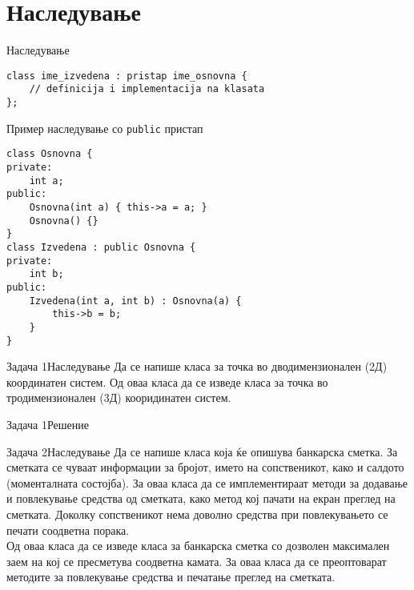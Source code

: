 
\section{Наследување}

\begin{frame}[fragile]{Наследување}
\begin{lstlisting}
class ime_izvedena : pristap ime_osnovna {
    // definicija i implementacija na klasata
};
\end{lstlisting}
\begin{exampleblock}{Пример наследување со \texttt{public} пристап}
\begin{lstlisting}
class Osnovna {
private:
    int a;
public:
    Osnovna(int a) { this->a = a; }
    Osnovna() {}
}
class Izvedena : public Osnovna {
private:
    int b;
public:
    Izvedena(int a, int b) : Osnovna(a) {
        this->b = b;
    }
}
\end{lstlisting}
\end{exampleblock}
\end{frame}

\begin{frame}{Задача 1}{Наследување}
Да се напише класа за точка во дводимензионален (2Д) координатен систем. Од оваа
класа да се изведе класа за точка во тродимензионален (3Д) кооридинатен систем.
\end{frame}

\begin{frame}[fragile]{Задача 1}{Решение}

\end{frame}

\begin{frame}{Задача 2}{Наследување}
Да се напише класа која ќе опишува банкарска сметка. За сметката се чуваат
информации за бројот, името на сопственикот, како и салдото (моменталната
состојба). За оваа класа да се имплементираат методи за додавање и повлекување
средства од сметката, како метод кој пачати на екран преглед на сметката.
Доколку сопственикот нема доволно средства при повлекувањето се печати соодветна порака.\\
Од оваа класа да се изведе класа за банкарска сметка со дозволен максимален
заем на кој се пресметува соодветна камата. За оваа класа да се преоптоварат
методите за повлекување средства и печатање преглед на сметката.
\end{frame}

